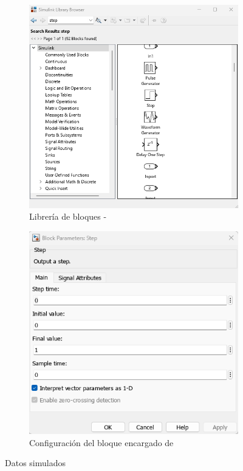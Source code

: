 \begin{figure}[htbp]
    \centering
    \begin{subfigure}[b]{0.35\textwidth}
        \centering
        \includegraphics[width=\textwidth]{fig/Capitulo5/Caso_de_estudio_PID/lib_step.png}
        \caption{Librería de bloques -}
        \label{fig:bias_sim}
    \end{subfigure}
    \hfill
    \begin{subfigure}[b]{0.45\textwidth}
        \centering
        \includegraphics[width=\textwidth]{fig/Capitulo5/Caso_de_estudio_PID/config_step.png}
        \caption{Configuración del bloque encargado de }
        \label{fig:oe_sim}
    \end{subfigure}
    \caption{Datos simulados}
    \label{fig:data_simulated}
\end{figure}

